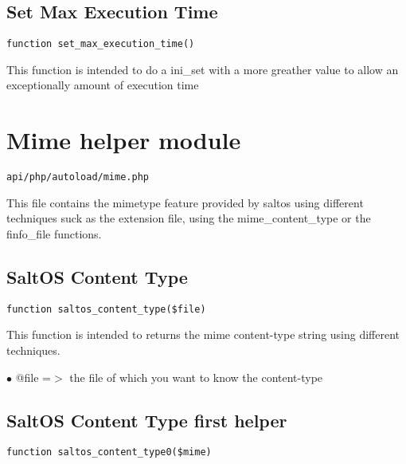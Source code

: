 \documentclass[a4paper]{book}
\begin{document}
\hypertarget{toc207}{}
\subsection{Set Max Execution Time}

\begin{lstlisting}
function set_max_execution_time()
\end{lstlisting}

This function is intended to do a ini\_set with a more greather value to allow an
exceptionally amount of execution time

\hypertarget{toc208}{}
\section{Mime helper module}

\begin{lstlisting}
api/php/autoload/mime.php
\end{lstlisting}

This file contains the mimetype feature provided by saltos using different techniques
suck as the extension file, using the mime\_content\_type or the finfo\_file functions.

\hypertarget{toc209}{}
\subsection{SaltOS Content Type}

\begin{lstlisting}
function saltos_content_type($file)
\end{lstlisting}

This function is intended to returns the mime content-type string using different
techniques.

\begin{compactitem}
\item[\color{myblue}$\bullet$] @file =$>$ the file of which you want to know the content-type
\end{compactitem}

\hypertarget{toc210}{}
\subsection{SaltOS Content Type first helper}

\begin{lstlisting}
function saltos_content_type0($mime)
\end{lstlisting}
\end{document}
